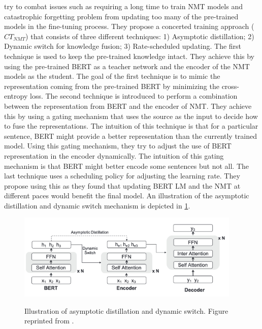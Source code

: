  try to combat issues such as requiring a long time to train NMT models and catastrophic forgetting problem from updating too many of the pre-trained models in the fine-tuning process. They propose a concerted training approach ($CT_{NMT}$) that consists of three different techniques: 1) Asymptotic distillation; 2) Dynamic switch for knowledge fusion; 3) Rate-scheduled updating. The first technique is used to keep the pre-trained knowledge intact. They achieve this by using the pre-trained BERT as a teacher network and the encoder of the NMT models as the student. The goal of the first technique is to mimic the representation coming from the pre-trained BERT by minimizing the cross-entropy loss. The second technique is introduced to perform a combination between the representation from BERT and the encoder of NMT. They achieve this by using a gating mechanism that uses the source as the input to decide how to fuse the representations. The intuition of this technique is that for a particular sentence, BERT might provide a better representation than the currently trained model. Using this gating mechanism, they try to adjust the use of BERT representation in the encoder dynamically. The intuition of this gating mechanism is that BERT might better encode some sentences but not all. The last technique uses a scheduling policy for adjusting the learning rate. They propose using this as they found that updating BERT LM and the NMT at different paces would benefit the final model. An illustration of the asymptotic distillation and dynamic switch mechanism is depicted in \cref{img:ctnmt}.

\begin{figure}[h]
    {\includegraphics[width=0.95\textwidth]{img/ctnmt.png}}
    \centering
    \caption{Illustration of asymptotic distillation and dynamic switch. Figure reprinted from .}
    \label{img:ctnmt}
\end{figure}

